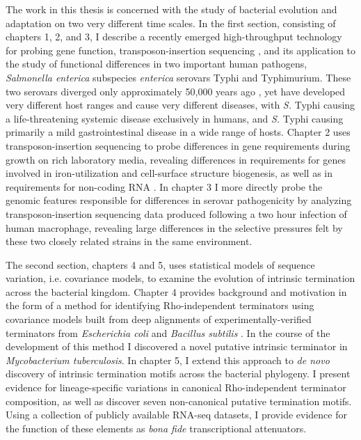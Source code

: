 The work in this thesis is concerned with the study of bacterial evolution and adaptation on two very different time scales. In the first section, consisting of chapters 1, 2, and 3, I describe a recently emerged high-throughput technology for probing gene function, transposon-insertion sequencing \parencite{Barquist2013}, and its application to the study of functional differences in two important human pathogens, \textit{Salmonella enterica} subspecies \textit{enterica} serovars Typhi and Typhimurium. These two serovars diverged only approximately 50,000 years ago \parencite{Kidgell2002}, yet have developed very different host ranges and cause very different diseases, with \textit{S.} Typhi causing a life-threatening systemic disease exclusively in humans, and \textit{S.} Typhi causing primarily a mild gastrointestinal disease in a wide range of hosts. Chapter 2 uses transposon-insertion sequencing to probe differences in gene requirements during growth on rich laboratory media, revealing differences in requirements for genes involved in iron-utilization and cell-surface structure biogenesis, as well as in requirements for non-coding RNA \parencite{Barquist2013a}. In chapter 3 I more directly probe the genomic features responsible for differences in serovar pathogenicity by analyzing transposon-insertion sequencing data produced following a two hour infection of human macrophage, revealing large differences in the selective pressures felt by these two closely related strains in the same environment.

The second section, chapters 4 and 5, uses statistical models of sequence variation, i.e. covariance models, to examine the evolution of intrinsic termination across the bacterial kingdom. Chapter 4 provides background and motivation in the form of a method for identifying Rho-independent terminators using covariance models built from deep alignments of experimentally-verified terminators from \textit{Escherichia coli} and \textit{Bacillus subtilis} \parencite{Gardner2011a}. In the course of the development of this method I discovered a novel putative intrinsic terminator in \textit{Mycobacterium tuberculosis}. In chapter 5, I extend this approach to \textit{de novo} discovery of intrinsic termination motifs across the bacterial phylogeny. I present evidence for lineage-specific variations in canonical Rho-independent terminator composition, as well as discover seven non-canonical putative termination motifs. Using a collection of publicly available RNA-seq datasets, I provide evidence for the function of these elements as \textit{bona fide} transcriptional attenuators.